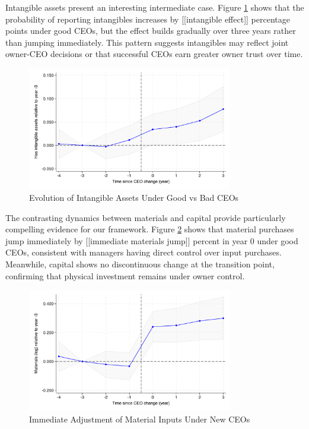 \documentclass[11pt,a4paper]{article}
\begin{document}
Intangible assets present an interesting intermediate case. Figure \ref{fig:intangibles} shows that the probability of reporting intangibles increases by [[intangible effect]] percentage points under good CEOs, but the effect builds gradually over three years rather than jumping immediately. This pattern suggests intangibles may reflect joint owner-CEO decisions or that successful CEOs earn greater owner trust over time.

\begin{figure}[htbp]
\centering
\includegraphics[width=0.8\textwidth]{figure/event_study_has_intangible.pdf}
\caption{Evolution of Intangible Assets Under Good vs Bad CEOs}
\label{fig:intangibles}
\end{figure}

The contrasting dynamics between materials and capital provide particularly compelling evidence for our framework. Figure \ref{fig:materials} shows that material purchases jump immediately by [[immediate materials jump]] percent in year 0 under good CEOs, consistent with managers having direct control over input purchases. Meanwhile, capital shows no discontinuous change at the transition point, confirming that physical investment remains under owner control.

\begin{figure}[htbp]
\centering
\includegraphics[width=0.8\textwidth]{figure/event_study_lnM.pdf}
\caption{Immediate Adjustment of Material Inputs Under New CEOs}
\label{fig:materials}
\end{figure}
\end{document}
